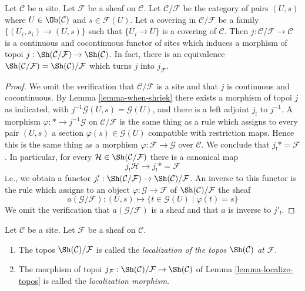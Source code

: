 \begin{lemma}
\label{lemma-localize-topos-site}
Let $\mathcal{C}$ be a site. Let $\mathcal{F}$ be a sheaf on $\mathcal{C}$.
Let $\mathcal{C}/\mathcal{F}$ be the category of pairs $(U, s)$ where
$U \in \Ob(\mathcal{C})$ and $s \in \mathcal{F}(U)$. Let a covering in
$\mathcal{C}/\mathcal{F}$ be a family $\{(U_i, s_i) \to (U, s)\}$
such that $\{U_i \to U\}$ is a covering of $\mathcal{C}$.
Then $j : \mathcal{C}/\mathcal{F} \to \mathcal{C}$ is a continuous
and cocontinuous functor of sites which induces a morphism of topoi
$j : \Sh(\mathcal{C}/\mathcal{F}) \to \Sh(\mathcal{C})$. In fact, there
is an equivalence $\Sh(\mathcal{C}/\mathcal{F}) =
\Sh(\mathcal{C})/\mathcal{F}$ which turns $j$ into $j_\mathcal{F}$.
\end{lemma}

\begin{proof}
We omit the verification that $\mathcal{C}/\mathcal{F}$ is a site and
that $j$ is continuous and cocontinuous. By
Lemma \ref{lemma-when-shriek} there exists a morphism of topoi
$j$ as indicated, with $j^{-1}\mathcal{G}(U, s) = \mathcal{G}(U)$,
and there is a left adjoint $j_!$ to $j^{-1}$. A morphism
$\varphi : * \to j^{-1}\mathcal{G}$ on $\mathcal{C}/\mathcal{F}$
is the same thing as a rule which assigns to every pair $(U, s)$ a
section $\varphi(s) \in \mathcal{G}(U)$ compatible with restriction maps.
Hence this is the same thing as a morphism
$\varphi : \mathcal{F} \to \mathcal{G}$ over $\mathcal{C}$.
We conclude that $j_!* = \mathcal{F}$. In particular, for every
$\mathcal{H} \in \Sh(\mathcal{C}/\mathcal{F})$ there is a canonical map
$$
j_!\mathcal{H} \to j_!* = \mathcal{F}
$$
i.e., we obtain a functor
$j'_! : \Sh(\mathcal{C}/\mathcal{F}) \to \Sh(\mathcal{C})/\mathcal{F}$.
An inverse to this functor is the rule which assigns to an object
$\varphi : \mathcal{G} \to \mathcal{F}$ of $\Sh(\mathcal{C})/\mathcal{F}$ the
sheaf
$$
a(\mathcal{G}/\mathcal{F}) :
(U, s) \longmapsto \{t \in \mathcal{G}(U) \mid \varphi(t) = s\}
$$
We omit the verification that $a(\mathcal{G}/\mathcal{F})$ is a sheaf
and that $a$ is inverse to $j'_!$.
\end{proof}

\begin{definition}
\label{definition-localize-topos}
Let $\mathcal{C}$ be a site.
Let $\mathcal{F}$ be a sheaf on $\mathcal{C}$.
\begin{enumerate}
\item The topos $\Sh(\mathcal{C})/\mathcal{F}$
is called the
{\it localization of the topos $\Sh(\mathcal{C})$ at $\mathcal{F}$}.
\item The morphism of topoi
$j_\mathcal{F} :
\Sh(\mathcal{C})/\mathcal{F}
\to
\Sh(\mathcal{C})$ of
Lemma \ref{lemma-localize-topos}
is called the {\it localization morphism}.
\end{enumerate}
\end{definition}

